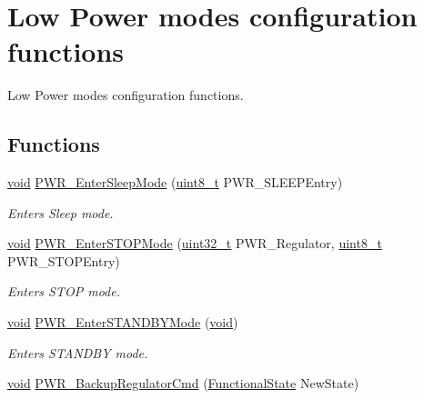 \hypertarget{group___p_w_r___group4}{\section{Low Power modes configuration functions}
\label{group___p_w_r___group4}
}


Low Power modes configuration functions.  


\subsection*{Functions}
\begin{DoxyCompactItemize}
\item 
\hyperlink{group___n_a_m_e_ga18028b8badbf1ea7e704ccac3c488e82}{void} \hyperlink{group___p_w_r___group4_ga7b33572878ffb7e22b65255d90512fe7}{P\-W\-R\-\_\-\-Enter\-Sleep\-Mode} (\hyperlink{stdint_8h_aba7bc1797add20fe3efdf37ced1182c5}{uint8\-\_\-t} P\-W\-R\-\_\-\-S\-L\-E\-E\-P\-Entry)
\begin{DoxyCompactList}\small\item\em Enters Sleep mode. \end{DoxyCompactList}\item 
\hyperlink{group___n_a_m_e_ga18028b8badbf1ea7e704ccac3c488e82}{void} \hyperlink{group___p_w_r___group4_ga694676ac06a9baf50eae45adae0118ab}{P\-W\-R\-\_\-\-Enter\-S\-T\-O\-P\-Mode} (\hyperlink{stdint_8h_a435d1572bf3f880d55459d9805097f62}{uint32\-\_\-t} P\-W\-R\-\_\-\-Regulator, \hyperlink{stdint_8h_aba7bc1797add20fe3efdf37ced1182c5}{uint8\-\_\-t} P\-W\-R\-\_\-\-S\-T\-O\-P\-Entry)
\begin{DoxyCompactList}\small\item\em Enters S\-T\-O\-P mode. \end{DoxyCompactList}\item 
\hyperlink{group___n_a_m_e_ga18028b8badbf1ea7e704ccac3c488e82}{void} \hyperlink{group___p_w_r___group4_ga00ddae00a9c327b81b24d2597b0052f3}{P\-W\-R\-\_\-\-Enter\-S\-T\-A\-N\-D\-B\-Y\-Mode} (\hyperlink{group___n_a_m_e_ga18028b8badbf1ea7e704ccac3c488e82}{void})
\begin{DoxyCompactList}\small\item\em Enters S\-T\-A\-N\-D\-B\-Y mode. \end{DoxyCompactList}\item 
\hyperlink{group___n_a_m_e_ga18028b8badbf1ea7e704ccac3c488e82}{void} \hyperlink{group___p_w_r___group4_ga83a4d6c5b048f2dab18e8fb04f5368d7}{P\-W\-R\-\_\-\-Backup\-Regulator\-Cmd} (\hyperlink{group___exported__types_gac9a7e9a35d2513ec15c3b537aaa4fba1}{Functional\-State} New\-State)

\end{DoxyCompactItemize}
